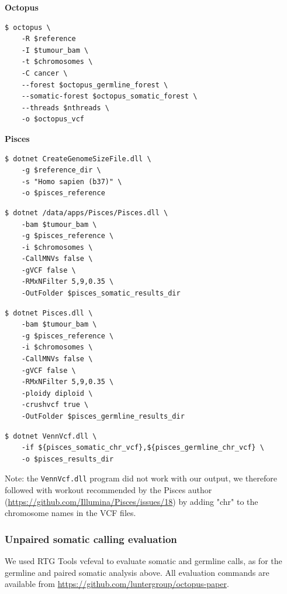 \documentclass{article}
\begin{document}
\noindent \textbf{Octopus}

\begin{lstlisting}
$ octopus \
    -R $reference
    -I $tumour_bam \
    -t $chromosomes \
    -C cancer \
    --forest $octopus_germline_forest \
    --somatic-forest $octopus_somatic_forest \
    --threads $nthreads \
    -o $octopus_vcf
\end{lstlisting}

\noindent \textbf{Pisces}

\begin{lstlisting}
$ dotnet CreateGenomeSizeFile.dll \
    -g $reference_dir \
    -s "Homo sapien (b37)" \
    -o $pisces_reference
\end{lstlisting}

\begin{lstlisting}
$ dotnet /data/apps/Pisces/Pisces.dll \
    -bam $tumour_bam \
    -g $pisces_reference \
    -i $chromosomes \
    -CallMNVs false \
    -gVCF false \
    -RMxNFilter 5,9,0.35 \
    -OutFolder $pisces_somatic_results_dir
\end{lstlisting}

\begin{lstlisting}
$ dotnet Pisces.dll \
    -bam $tumour_bam \
    -g $pisces_reference \
    -i $chromosomes \
    -CallMNVs false \
    -gVCF false \
    -RMxNFilter 5,9,0.35 \
    -ploidy diploid \
    -crushvcf true \
    -OutFolder $pisces_germline_results_dir
\end{lstlisting}

\begin{lstlisting}
$ dotnet VennVcf.dll \
    -if ${pisces_somatic_chr_vcf},${pisces_germline_chr_vcf} \
    -o $pisces_results_dir
\end{lstlisting}

\noindent Note: the  \lstinline!VennVcf.dll! program did not work with our output, we therefore followed with workout recommended by the Pisces author (\url{https://github.com/Illumina/Pisces/issues/18}) by adding "chr" to the chromosome names in the VCF files.

\subsubsection*{Unpaired somatic calling evaluation}

\noindent We used RTG Tools vcfeval to evaluate somatic and germline calls, as for the germline and paired somatic analysis above. All evaluation commands are available from \url{https://github.com/luntergroup/octopus-paper}.
\end{document}

